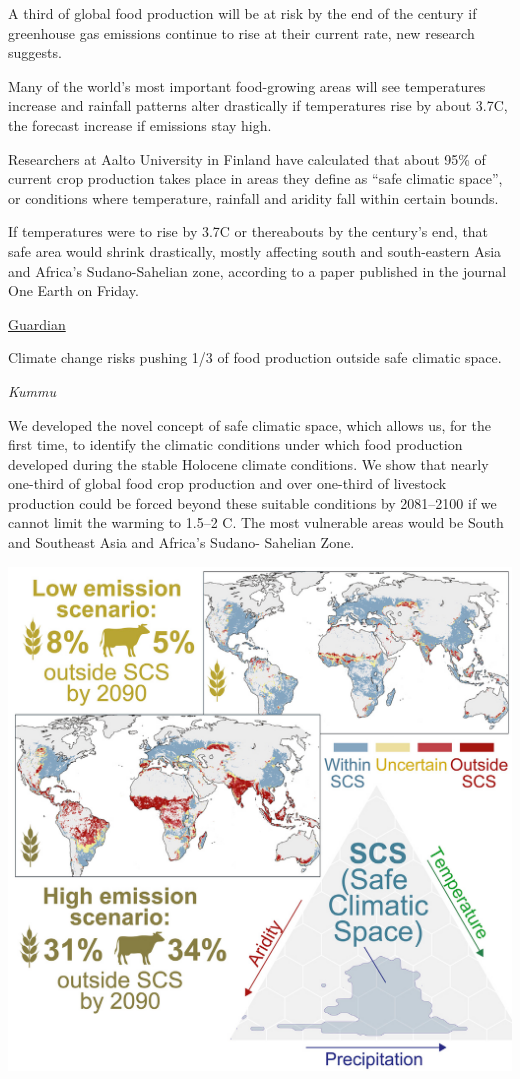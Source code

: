 \documentclass[
]{book}
\begin{document}
A third of global food production will be at risk by the end of the century if greenhouse gas emissions continue to rise at their current rate, new research suggests.

Many of the world's most important food-growing areas will see temperatures increase and rainfall patterns alter drastically if temperatures rise by about 3.7C, the forecast increase if emissions stay high.

Researchers at Aalto University in Finland have calculated that about 95\% of current crop production takes place in areas they define as ``safe climatic space'', or conditions where temperature, rainfall and aridity fall within certain bounds.

If temperatures were to rise by 3.7C or thereabouts by the century's end, that safe area would shrink drastically, mostly affecting south and south-eastern Asia and Africa's Sudano-Sahelian zone, according to a paper published in the journal One Earth on Friday.

\href{https://www.theguardian.com/environment/2021/may/14/third-of-global-food-production-at-risk-from-climate-crisis}{Guardian}

Climate change risks pushing 1/3 of food production outside safe climatic space.

\emph{Kummu}

We developed the novel concept of safe
climatic space, which allows us, for the
first time, to identify the climatic
conditions under which food production
developed during the stable Holocene
climate conditions. We show that nearly
one-third of global food crop production
and over one-third of livestock
production could be forced beyond these
suitable conditions by 2081--2100 if we
cannot limit the warming to 1.5--2 C. The
most vulnerable areas would be South
and Southeast Asia and Africa's Sudano-
Sahelian Zone.

\includegraphics{fig/agricultural_safe_climatic_space.png}
\end{document}
